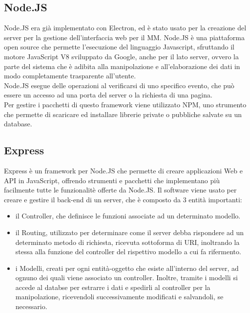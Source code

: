 \subsection{Node.JS}
Node.JS era gi\`a implementato con Electron, ed \`e stato usato per la creazione del server
per la gestione dell'interfaccia web per il MM.
Node.JS \`e una piattaforma open source che permette l'esecuzione del linguaggio Javascript, sfruttando il motore JavaScript V8 sviluppato da Google,
anche per il lato server, ovvero
la parte del sistema che \`e adibita alla manipolazione e all'elaborazione
dei dati in modo completamente trasparente all'utente.\\
Node.JS esegue delle operazioni al verificarsi di uno specifico evento, che pu\`o essere un accesso ad una porta
del server o la richiesta di una pagina.\\
Per gestire i pacchetti di questo framework viene utilizzato NPM\cite{NPM}, uno strumento che permette
di scaricare ed installare librerie private o pubbliche salvate su un database.
\\[1\baselineskip]

\subsection{Express}\label{cap:express}
Express \`e un framework per Node.JS che permette di creare applicazioni Web e API in JavaScript, offrendo strumenti e pacchetti
che implementano pi\`u facilmente tutte le funzionalit\`e offerte da Node.JS.
Il software viene usato per creare e gestire il back-end di un server, che \`e composto da 3 entit\`a importanti:
\begin{itemize}
\item il Controller, che definisce le funzioni associate ad un determinato modello.
\item il Routing, utilizzato per determinare come il server debba rispondere ad un determinato metodo di richiesta,
ricevuta sottoforma di URI, inoltrando la stessa alla funzione del controller del rispettivo modello a cui fa rifermento.
\item i Modelli, creati per ogni entit\`a-oggetto che esiste all'interno del server, ad ognuno dei quali viene associato
un controller. Inoltre, tramite i modelli si accede al databse per estrarre i dati e spedirli al controller per
la manipolazione, ricevendoli successivamente modificati e salvandoli, se necessario.
\\[2\baselineskip]
\end{itemize}

